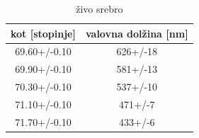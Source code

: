 \documentclass[12pt]{article}
\begin{document}
\begin{table}[!ht]
\centering
\begin{tabular}{c|c}
    kot [stopinje]& valovna dolžina [nm] \\\hline
    69.60+/-0.10 & 626+/-18 \\
    69.90+/-0.10 & 581+/-13 \\
    70.30+/-0.10 & 537+/-10 \\
    71.10+/-0.10 & 471+/-7 \\
    71.70+/-0.10 & 433+/-6 \\
\end{tabular}
\caption{živo srebro}
\label{Hg}
\end{table}
\end{document}
